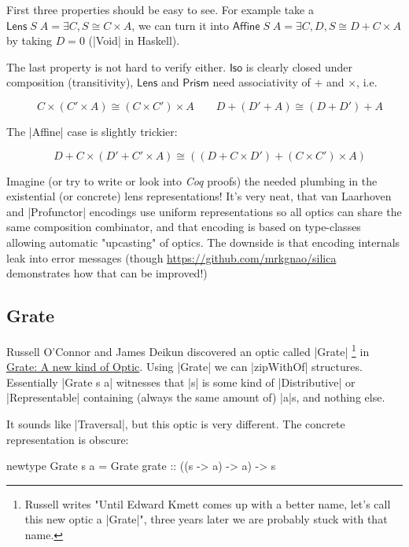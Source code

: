 \documentclass{article}
\begin{document}
First three properties should be easy to see.
For example take a $\mathsf{Lens}\;S\;A = \exists C, S\cong C \times A$,
we can turn it into $\mathsf{Affine}\;S\;A = \exists C, D, S\cong D + C \times A$
by taking $D = 0$ (|Void| in Haskell).

The last property is not hard to verify either. $\mathsf{Iso}$ is clearly
closed under composition (transitivity), $\mathsf{Lens}$ and $\mathsf{Prism}$
need associativity of $+$ and $\times$, i.e.

\begin{equation}
  \quad C \times (C' \times A) \cong (C \times C') \times A
  \qquad D + (D' + A) \cong (D + D') + A
\end{equation}

The |Affine| case is slightly trickier:

\begin{equation}
  \quad D + C \times (D' + C' \times A) \cong ((D + C \times D')+ (C \times C') \times A)
\end{equation}

Imagine (or try to write or look into \emph{Coq} proofs) the needed plumbing in the
existential (or concrete) lens representations! It's very neat, that
van Laarhoven and |Profunctor| encodings use uniform representations so
all optics can share the same composition combinator, and that encoding is
based on type-classes allowing automatic "upcasting" of optics.
The downside is that encoding internals leak into error messages (though
\url{https://github.com/mrkgnao/silica} demonstrates how that can be improved!)

\subsection{Grate}

Russell O'Connor and James Deikun discovered an optic called |Grate|
\footnote{Russell writes "Until Edward Kmett comes up with a better name, let's call this new optic a |Grate|",
three years later we are probably stuck with that name.}
in \href{https://r6research.livejournal.com/28050.html}{Grate: A new kind of
Optic}.  Using |Grate| we can |zipWithOf| structures. Essentially |Grate s a|
witnesses that |s| is some kind of |Distributive| or |Representable| containing
(always the same amount of) |a|s, and nothing else.

It sounds like |Traversal|, but this optic is very different.
The concrete representation is obscure:

\begin{code}
newtype Grate s a = Grate { grate :: ((s -> a) -> a) -> s }
\end{code}
\end{document}
